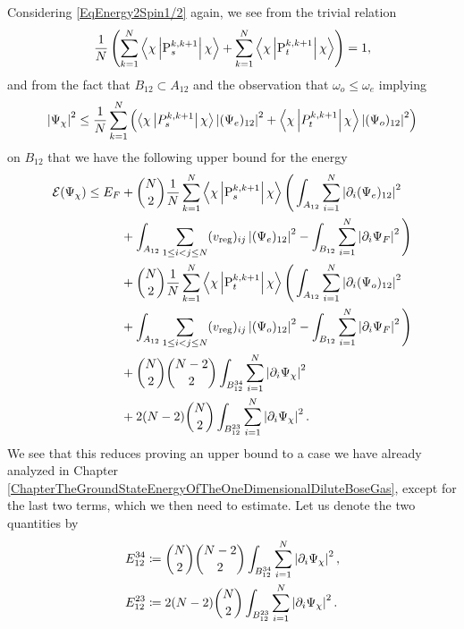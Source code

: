 Considering \eqref{EqEnergy2Spin1/2} again, we see from the trivial relation $$
\frac{1}{N}\left(\sum_{k=1}^{N} \left\langle\chi \left\lvert \operatorname{P}^{k,k+1}_s  \right\rvert \chi\right\rangle+\sum_{k=1}^{N}\left\langle\chi \left\lvert \operatorname{P}^{k,k+1}_t  \right\rvert \chi\right\rangle\right)=1,
$$
and from the fact that $ B_{12}\subset A_{12} $ and the observation that $\omega_o\leq \omega_e$ implying
\begin{equation}\label{EqPotentialEnergySpin1/2Term}
	\left\lvert \Psi_{\chi} \right\rvert^2\leq \frac{1}{N}\sum_{k=1}^{N}\left(\left\langle\chi \left\vert P_{s}^{k,k+1} \right\vert\chi\right\rangle\left\lvert (\Psi_e)_{12} \right\rvert^2+\left\langle\chi \left\vert P_{t}^{k,k+1} \right\vert\chi\right\rangle\left\lvert (\Psi_o)_{12} \right\rvert^2\right)
\end{equation}
 on $ B_{12} $ that we have the following upper bound for the energy\begin{equation}\label{EqTrialStateEnergyUpperBound1}
	\begin{aligned}
	\mathcal{E}(\Psi_{\chi})\leq E_F&+\binom{N}{2}\frac{1}{N}\sum_{k=1}^{N}\left\langle\chi \left\lvert \operatorname{P}^{k,k+1}_s  \right\rvert \chi\right\rangle\Bigg(\int_{A_{12}}\sum_{i=1}^{N}\left\lvert \partial_i(\Psi_e)_{12} \right\rvert^2\\
	&+\int_{A_{12}}\sum_{1\leq i<j\leq N}(v_{\text{reg}})_{ij}\left\lvert (\Psi_e)_{12} \right\rvert^2-\int_{B_{12}}\sum_{i=1}^{N}\left\lvert \partial_i \Psi_F \right\rvert^2\Bigg)\\
	&+\binom{N}{2}\frac{1}{N}\sum_{k=1}^{N}\left\langle\chi \left\lvert \operatorname{P}^{k,k+1}_t  \right\rvert \chi\right\rangle\Bigg(\int_{A_{12}}\sum_{i=1}^{N}\left\lvert \partial_i(\Psi_o)_{12} \right\rvert^2\\
	&+\int_{A_{12}}\sum_{1\leq i<j\leq N}(v_{\text{reg}})_{ij}\left\lvert (\Psi_o)_{12} \right\rvert^2-\int_{B_{12}}\sum_{i=1}^{N}\left\lvert \partial_i \Psi_F \right\rvert^2\Bigg)\\
	&+\binom{N}{2}\binom{N-2}{2}\int_{B_{12}^{34}}\sum_{i=1}^{N}\left\lvert \partial_i\Psi_{\chi} \right\rvert^2\\
	&+2(N-2)\binom{N}{2}\int_{B_{12}^{23}}\sum_{i=1}^{N}\left\lvert \partial_i\Psi_{\chi} \right\rvert^2.
	\end{aligned}
\end{equation}
We see that this reduces proving an upper bound to a case we have already analyzed in Chapter \ref{ChapterTheGroundStateEnergyOfTheOneDimensionalDiluteBoseGas}, except for the last two terms, which we then need to estimate. Let us denote the two quantities by \begin{equation}
\begin{aligned}
E_{12}^{34}&\coloneqq\binom{N}{2}\binom{N-2}{2}\int_{B_{12}^{34}}\sum_{i=1}^{N}\left\lvert \partial_i\Psi_{\chi} \right\rvert^2,\\
E_{12}^{23}&\coloneqq 2(N-2)\binom{N}{2}\int_{B_{12}^{23}}\sum_{i=1}^{N}\left\lvert \partial_i\Psi_{\chi} \right\rvert^2.
\end{aligned}
\end{equation} 
